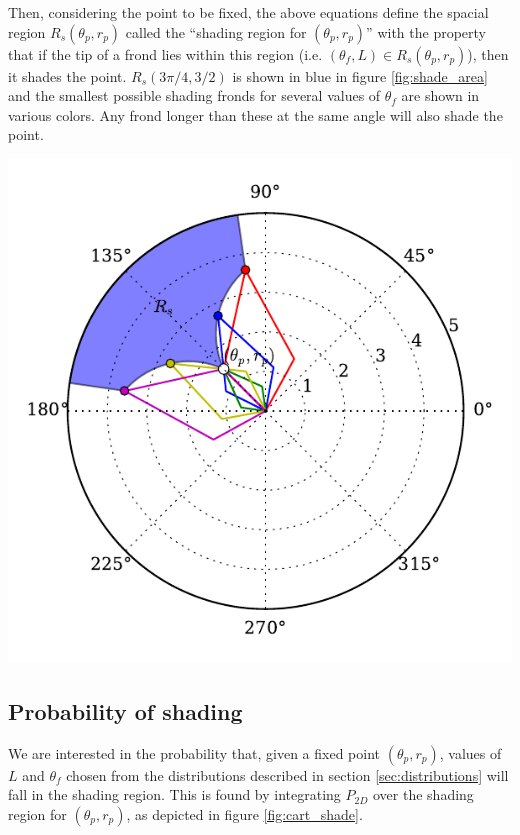 \documentclass[10pt]{article}
\newenvironment{mcfig}
	{\par\medskip\noindent\minipage{\linewidth}}
	{\endminipage\par\medskip}
\begin{document}
\begin{multicols}{2}
Then, considering the point to be fixed, the above equations define the spacial region $R_s(\theta_p,r_p)$ called the ``shading region for $(\theta_p,r_p)$'' with the property that if the tip of a frond lies within this region (i.e. $(\theta_f,L) \in R_s(\theta_p,r_p)$), then it shades the point.
$R_s(3\pi/4,3/2)$ is shown in blue in figure \ref{fig:shade_area} and the smallest possible shading fronds for several values of $\theta_f$ are shown in various colors.
Any frond longer than these at the same angle will also shade the point.

\begin{mcfig}
	\centering
	\includegraphics[width=\linewidth]{shade_area}
	\vspace{-2em}
	\label{fig:shade_area}
\end{mcfig}

\subsection{Probability of shading}
We are interested in the probability that, given a fixed point $(\theta_p,r_p)$, values of $L$ and $\theta_f$ chosen from the distributions described in section \ref{sec:distributions} will fall in the shading region.
This is found by integrating $P_{2D}$ over the shading region for $(\theta_p,r_p)$, as depicted in figure \ref{fig:cart_shade}.


\end{multicols}
\end{document}
